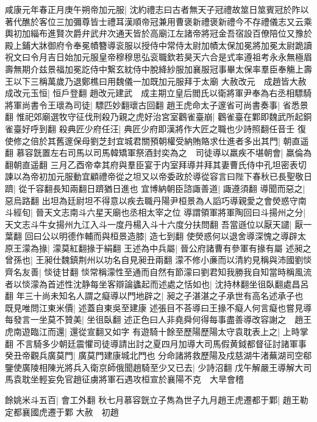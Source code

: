 咸康元年春正月庚午朔帝加元服|{
	沈約禮志曰古者無天子冠禮故筮日筮賓冠於阼以著代醮於客位三加彌尊皆士禮耳漢順帝冠兼用曹褒新禮褒新禮今不存禮儀志又云乘輿初加緇布進賢次爵弁武弁次通天皆於高廟江左諸帝將冠金吾宿設百僚陪位又豫於殿上鋪大牀御府令奉冕幘簪導衮服以授侍中常侍太尉加幘太保加冕將加冕太尉跪讀祝文曰令月吉日始加元服皇帝穆穆思弘衮職欽若昊天六合是式率遵祖考永永無極眉壽無期介兹景福加冕訖侍中繋玄紞侍中脫絳紗服加襄服冠事畢太保率羣臣奉觴上壽王以下三稱萬歲乃退鄭樵曰用魏儀一加既加元服拜于太廟}
大赦改元　成趙皆大赦成改元玉恒|{
	恒戶登翻}
趙改元建武　成主期立皇后閻氏以衛將軍尹奉為右丞相驃騎將軍尚書令王瓌為司徒|{
	驃匹妙翻瓌古回翻}
趙王虎命太子邃省可尚書奏事|{
	省悉景翻}
惟祀郊廟選牧守征伐刑殺乃親之虎好治宮室鸛雀臺崩|{
	鸛雀臺在鄴即魏武所起銅雀臺好呼到翻}
殺典匠少府任汪|{
	典匠少府即漢將作大匠之職也少詩照翻任音壬}
復使修之倍於其舊邃保母劉芝封宜城君關預朝權受納賄賂求仕進者多出其門|{
	朝直遥翻}
慕容皝置左右司馬以司馬韓矯軍祭酒封奕為之　司徒導以羸疾不堪朝會|{
	羸倫為翻朝直遥翻}
三月乙酉帝幸其府與羣臣宴于内室拜導并拜其妻曹氏侍中孔坦密表切諫以為帝初加元服動宜顧禮帝從之坦又以帝委政於導從容言曰陛下春秋已長聖敬日躋|{
	從千容翻長知兩翻日躋猶日進也}
宜博納朝臣諮諏善道|{
	諏遵須翻}
導聞而惡之|{
	惡烏路翻}
出坦為廷尉坦不得意以疾去職丹陽尹桓景為人謟巧導親愛之會熒惑守南斗經旬|{
	晉天文志南斗六星天廟也丞相太宰之位}
導謂領軍將軍陶回曰斗揚州之分|{
	天文志斗牛女揚州九江入斗一度丹楊入斗十六度分扶問翻}
吾當遜位以厭天譴|{
	厭一葉翻}
回曰公以明德作輔而與桓景造膝|{
	造七到翻}
使熒惑何以退舍導深愧之導辟太原王濛為掾|{
	濛莫紅翻掾于絹翻}
王述為中兵屬|{
	晉公府諸曹有參軍有掾有屬}
述昶之曾孫也|{
	王昶仕魏鎮荆州以功名自見昶丑兩翻}
濛不修小亷而以清約見稱與沛國劉惔齊名友善|{
	惔徒甘翻}
惔常稱濛性至通而自然有節濛曰劉君知我勝我自知當時稱風流者以惔濛為首述性沈静每坐客辯論蠭起而述處之恬如也|{
	沈持林翻坐徂臥翻處昌呂翻}
年三十尚未知名人謂之癡導以門地辟之|{
	昶之子湛湛之子承世有高名述承子也}
既見唯問江東米價|{
	述蓋自東吳至建康}
述張目不荅導曰王掾不癡人何言癡也嘗見導每發言一坐莫不贊美|{
	坐徂臥翻}
述正色曰人非堯舜何得每事盡善導改容謝之　趙王虎南遊臨江而還|{
	還從宣翻又如字}
有遊騎十餘至歷陽歷陽太守袁耽表上之|{
	上時掌翻}
不言騎多少朝廷震懼司徒導請出討之夏四月加導大司馬假黄鉞都督征討諸軍事癸丑帝觀兵廣莫門|{
	廣莫門建康城北門也}
分命諸將救歷陽及戍慈湖牛渚蕪湖司空郗鑒使廣陵相陳光將兵入衛京師俄聞趙騎至少又已去|{
	少詩沼翻}
戊午解嚴王導解大司馬袁耽坐輕妄免官趙征虜將軍石遇攻桓宣於襄陽不克　大旱會稽

餘姚米斗五百|{
	會工外翻}
秋七月慕容皝立子雋為世子九月趙王虎遷都于鄴|{
	趙王勒定都襄國虎遷于鄴}
大赦　初趙

